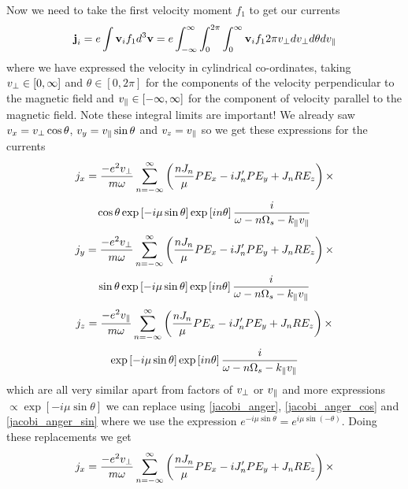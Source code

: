 Now we need to take the first velocity moment $f_1$ to get our currents
\begin{equation}
	\textbf{j}_i = e \int \textbf{v}_i f_1 d^3 \textbf{v} = e \int_{-\infty}^\infty \int_0^{2 \pi} \int_0^\infty \textbf{v}_i f_1 2 \pi v_\perp dv_\perp d \theta d v_\parallel
\end{equation}
where we have expressed the velocity in cylindrical co-ordinates, taking $v_\perp \in \left[0, \infty \right]$ and $\theta \in \left[0, 2\pi\right]$ for the components of the velocity perpendicular to the magnetic field and $v_\parallel \in \left[ -\infty, \infty \right]$ for the component of velocity parallel to the magnetic field. Note these integral limits are important!
We already saw $v_x = v_\perp \cos\theta$, $v_y = v_\parallel \sin\theta$ and $v_z = v_\parallel$ so we get these expressions for the currents
\begin{equation*}
	j_x = \frac{-e^2v_\perp}{m \omega} \sum_{n=-\infty}^\infty \left(\frac{nJ_n}{\mu} P E_x - i J_n' P E_y + J_n R E_z \right) \times
\end{equation*}
\begin{equation}
	\cos\theta \exp \left[-i\mu \sin\theta \right] \exp \left[in \theta \right] \frac{i}{\omega - n\Omega_s - k_\parallel v_\parallel}
\end{equation}
\begin{equation*}
	j_y = \frac{-e^2v_\perp}{m \omega} \sum_{n=-\infty}^\infty \left(\frac{nJ_n}{\mu} P E_x - i J_n' P E_y + J_n R E_z \right) \times
\end{equation*}
\begin{equation}
	\sin\theta \exp \left[-i\mu \sin\theta \right] \exp \left[in \theta \right] \frac{i}{\omega - n\Omega_s - k_\parallel v_\parallel}
\end{equation}
\begin{equation*}
	j_z = \frac{-e^2v_\parallel}{m \omega} \sum_{n=-\infty}^\infty \left(\frac{nJ_n}{\mu} P E_x - i J_n' P E_y + J_n R E_z \right) \times
\end{equation*}
\begin{equation}
	\exp \left[-i\mu \sin\theta \right] \exp \left[in \theta \right] \frac{i}{\omega - n\Omega_s - k_\parallel v_\parallel}
\end{equation}
which are all very similar apart from factors of $v_\perp$ or $v_\parallel$ and more expressions $\propto \exp \left[-i\mu \sin\theta \right]$ we can replace using \eqref{jacobi_anger}, \eqref{jacobi_anger_cos} and \eqref{jacobi_anger_sin} where we use the expression $e^{-i\mu\sin\theta} = e^{i\mu\sin\left(-\theta\right)}$. Doing these replacements we get
\begin{equation*}
	j_x = \frac{-e^2v_\perp}{m \omega} \sum_{n=-\infty}^\infty \left(\frac{nJ_n}{\mu} P E_x - i J_n' P E_y + J_n R E_z \right) \times
\end{equation*}
